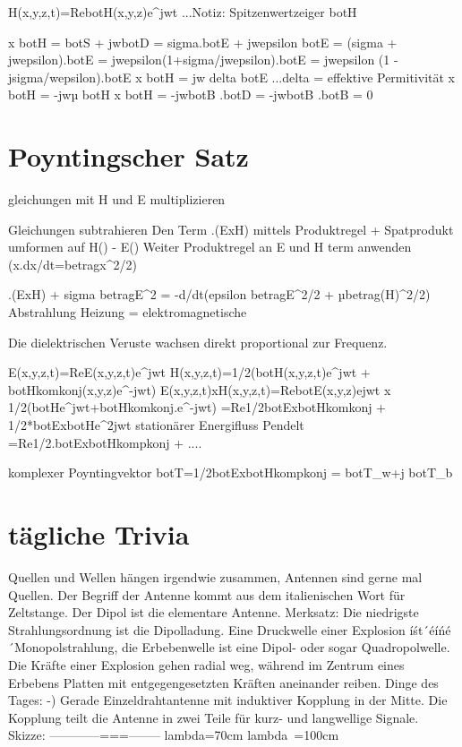 \documentclass[a4paper]{article}
\begin{document}
H(x,y,z,t)=Re{botH(x,y,z)e^jwt} ...Notiz: Spitzenwertzeiger botH

\nabla x botH = botS + jwbotD = sigma.botE + jwepsilon botE = (sigma + jwepsilon).botE = jwepsilon(1+sigma/jwepsilon).botE = jwepsilon (1 - jsigma/wepsilon).botE
        \nabla x botH = jw delta botE   ...delta = effektive Permitivität
        \nabla x botH = -jwµ botH
\nabla x botH = -jwbotB
\nabla.botD = -jwbotB
\nabla.botB = 0

\section{Poyntingscher Satz}
gleichungen mit H und E multiplizieren

Gleichungen subtrahieren
Den Term \nabla.(ExH) mittels Produktregel + Spatprodukt umformen auf H(\nablaxE) - E(\nablaxH)
Weiter Produktregel an E und H term anwenden (x.dx/dt=betragx^2/2)

\nabla.(ExH) + sigma betragE^2 = -d/dt(epsilon betragE^2/2 + µbetrag(H)^2/2)
Abstrahlung   Heizung         =          elektromagnetische


Die dielektrischen Veruste wachsen direkt proportional zur Frequenz.

E(x,y,z,t)=Re{E(x,y,z,t)e^jwt}
H(x,y,z,t)=1/2(botH(x,y,z,t)e^jwt + botHkomkonj(x,y,z)e^-jwt)
E(x,y,z,t)xH(x,y,z,t)=Re{botE(x,y,z)ejwt} x 1/2(botHe^jwt+botHkomkonj.e^-jwt)
                    =Re{1/2botExbotHkomkonj + 1/2*botExbotHe^2jwt}
                    stationärer Energifluss        Pendelt
                    =Re{1/2.botExbotHkompkonj} + ....

    komplexer Poyntingvektor botT=1/2botExbotHkompkonj = botT_w+j botT_b


\section{tägliche Trivia}
Quellen und Wellen hängen irgendwie zusammen, Antennen sind gerne mal Quellen.
Der Begriff der Antenne kommt aus dem italienischen Wort für Zeltstange.
Der Dipol ist die elementare Antenne.
Merksatz: Die niedrigste Strahlungsordnung ist die Dipolladung.
Eine Druckwelle einer Explosion íśt´éíńé´Monopolstrahlung, die Erbebenwelle ist
eine Dipol- oder sogar Quadropolwelle.
Die Kräfte einer Explosion gehen radial weg, während im Zentrum eines Erbebens
Platten mit entgegengesetzten Kräften aneinander reiben.
Dinge des Tages:
-) Gerade Einzeldrahtantenne mit induktiver Kopplung in der Mitte. Die Kopplung teilt die Antenne in zwei Teile für kurz- und langwellige Signale.
       Skizze: ------------===--------
                lambda=70cm   lambda~=100cm
\end{document}
